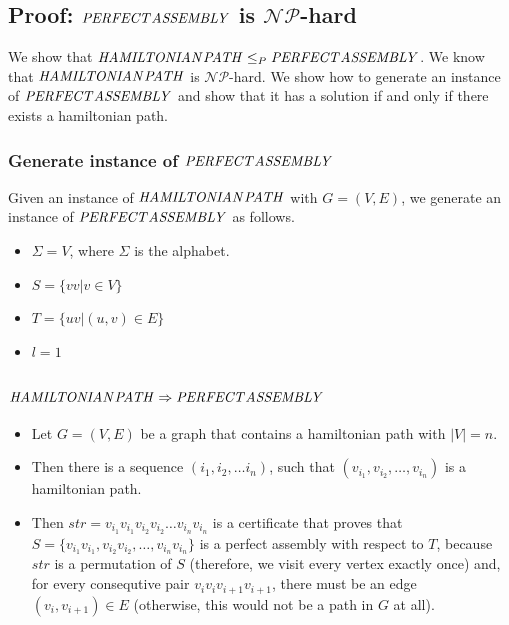 \documentclass[12pt]{article}
\begin{document}
\subsection*{Proof: $\mathit{PERFECT\-ASSEMBLY}$ is $\mathcal{NP}$-hard}
We show that $\mathit{HAMILTONIAN\-PATH} \leq_P \mathit{PERFECT\-ASSEMBLY}$. We know that $\mathit{HAMILTONIAN\-PATH}$ is $\mathcal{NP}$-hard. We show how to generate an instance of $\mathit{PERFECT\-ASSEMBLY}$ and show that it has a solution if and only if there exists a hamiltonian path.

\subsubsection*{Generate instance of $\mathit{PERFECT\-ASSEMBLY}$}
Given an instance of $\mathit{HAMILTONIAN\-PATH}$ with $G=(V,E)$, we generate an instance of $\mathit{PERFECT\-} \\ \mathit{ASSEMBLY}$ as follows.

\begin{itemize}
	\item $\Sigma = V$, where $\Sigma$ is the alphabet.
	\item $S = \{vv \left.\right| v \in V\}$
	\item $T = \{uv \left.\right| (u,v) \in E\}$
	\item $l = 1$
\end{itemize}

\subsubsection*{$\mathit{HAMILTONIAN\-PATH} \Rightarrow \mathit{PERFECT\-ASSEMBLY}$}
\begin{itemize}
	\item Let $G=(V,E)$ be a graph that contains a hamiltonian path with $|V| = n$.
	\item Then there is a sequence $(i_1, i_2, \ldots i_n)$, such that $(v_{i_1}, v_{i_2}, \ldots,  v_{i_n})$ is a hamiltonian path.
	\item Then $\mathit{str} = v_{i_1}v_{i_1}v_{i_2}v_{i_2} \ldots v_{i_n}v_{i_n}$ is a certificate that proves that $S = \{v_{i_1}v_{i_1}, v_{i_2}v_{i_2}, \ldots, v_{i_n}v_{i_n}\}$ is a perfect assembly with respect to $T$, because $\mathit{str}$ is a permutation of $S$ (therefore, we visit every vertex exactly once) and, for every consequtive pair $v_iv_iv_{i+1}v_{i+1}$, there must be an edge $(v_i,v_{i+1}) \in E$ (otherwise, this would not be a path in $G$ at all).
\end{itemize}
\end{document}
